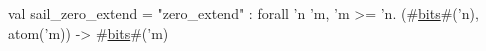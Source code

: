 val sail_zero_extend = "zero_extend" : forall 'n 'm, 'm >= 'n. (#\hyperref[zbits]{bits}#('n), atom('m)) -> #\hyperref[zbits]{bits}#('m)

